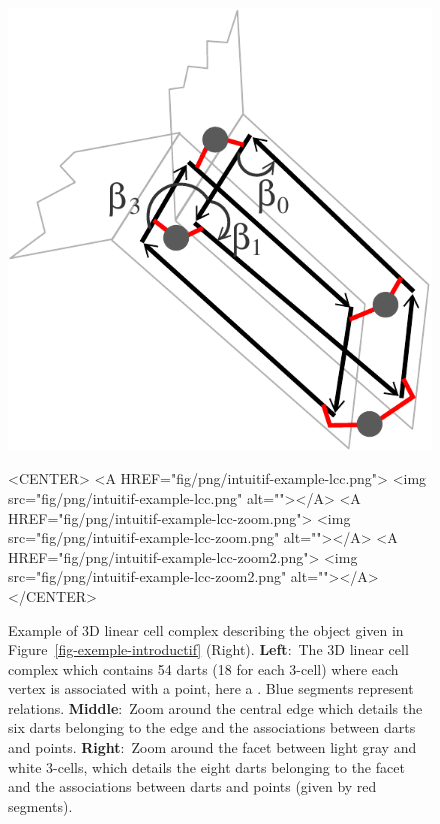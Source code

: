 \begin{figure}[h]
\begin{ccTexOnly}
\begin{center}
      \includegraphics[width=\LargFig]{Linear_cell_complex/fig/pdf/intuitif-example-lcc-zoom2}
    \end{center}
  \end{ccTexOnly}
  \begin{ccHtmlOnly}
    <CENTER>
    <A HREF="fig/png/intuitif-example-lcc.png">
    <img src="fig/png/intuitif-example-lcc.png" alt=""></A>
    <A HREF="fig/png/intuitif-example-lcc-zoom.png">
        <img src="fig/png/intuitif-example-lcc-zoom.png" alt=""></A>
    <A HREF="fig/png/intuitif-example-lcc-zoom2.png">
        <img src="fig/png/intuitif-example-lcc-zoom2.png" alt=""></A>
    </CENTER>
    \end{ccHtmlOnly}
    \caption{Example of 3D linear cell complex describing the object
      given in Figure~\ref{fig-exemple-introductif} (Right).
      \textbf{Left}:~The 3D linear cell complex which contains 54 darts
      (18 for each 3-cell) where each vertex is associated with a
      point, here a . Blue segments represent \betatrois{} relations.
      \textbf{Middle}:~Zoom around
      the central edge which details the six darts belonging to the
      edge and the associations between darts and points.
      \textbf{Right}:~Zoom around the facet between light gray and
      white 3-cells, which details the eight darts belonging to the
      facet and the associations between darts and
      points (given by red segments).\label{fig-exemple-introductif-lcc}}
\end{figure}

